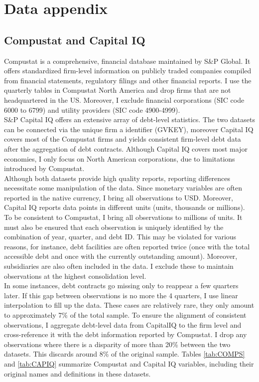 \documentclass[12pt]{article}
\begin{document}
\section{Data appendix \label{sec:A3}}
\subsection{Compustat and Capital IQ}
Compustat is a comprehensive, financial database maintained by S\&P Global. It offers standardized firm-level information on publicly traded companies compiled from financial statements, regulatory filings and other financial reports. I use the quarterly tables in Compustat North America and drop firms that are not headquartered in the US. Moreover, I exclude financial corporations (SIC code 6000 to 6799) and utility providers (SIC code 4900-4999). \vspace{3mm} \\
S\&P Capital IQ offers an extensive array of debt-level statistics. The two datasets can be connected via the unique firm a identifier (GVKEY), moreover Capital IQ covers most of the Compustat firms and yields consistent firm-level debt data after the aggregation of debt contracts. Although Capital IQ covers most major economies, I only focus on North American corporations, due to limitations introduced by Compustat.  \vspace{3mm} \\
Although both datasets provide high quality reports, reporting differences necessitate some manipulation of the data. Since monetary variables are often reported in the native currency, I bring all observations to USD. Moreover, Capital IQ reports data points in different units (units, thousands or millions). To be consistent to Compustat, I bring all observations to millions of units. It must also be ensured that each observation is uniquely identified by the combination of year, quarter, and debt ID. This may be violated for various reasons, for instance, debt facilities are often reported twice (once with the total accessible debt and once with the currently outstanding amount). Moreover, subsidiaries are also often included in the data. I exclude these to maintain observations at the highest consolidation level. \vspace{3mm} \\
In some instances, debt contracts go missing only to reappear a few quarters later. If this gap between observations is no more the 4 quarters, I use linear interpolation to fill up the data. These cases are relatively rare, they only amount to approximately 7\% of the total sample. To ensure the alignment of consistent observations, I aggregate debt-level data from CapitalIQ to the firm level and cross-reference it with the debt information reported by Compustat. I drop any observations where there is a disparity of more than 20\% between the two datasets. This discards around 8\% of the original sample. Tables \ref{tab:COMPS} and \ref{tab:CAPIQ} summarize Compustat and Capital IQ variables, including their original names and definitions in these datasets.
\end{document}
